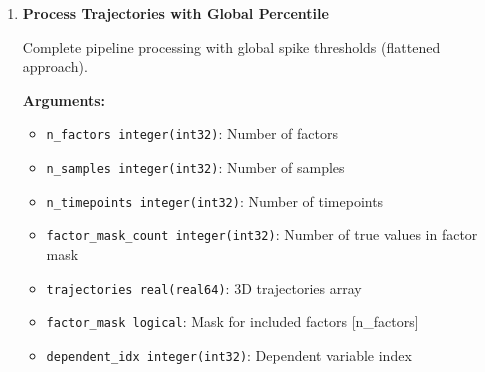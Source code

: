 \begin{enumerate}
\begin{enumerate}
\begin{itemize}
                    \item \texttt{ierr integer(int32)}: Error code
                  \end{itemize}
                  \begin{lstlisting}[language=Fortran, caption={Complete Pipeline with Per-Timepoint Thresholds}]
call process_trajectories_alloc(trajectories, n_factors, n_samples, &
                    n_timepoints, factor_mask, factor_mask_count, & 
                    dependent_idx, mode, percentile, &
                    integrated_contribs,spike_contribs, &
                    thresholds_integrated_contrib, &
                    outliers_integrated_contrib, &
                    thresholds_spike_contrib, &
                    outliers_spike_contrib, ierr)
                  \end{lstlisting}
                  
            \item \textbf{Process Trajectories with Global Percentile}
                  
                  Complete pipeline processing with global spike thresholds (flattened
                  approach).
                  
                  \textbf{Arguments:}
                  \begin{itemize}
                    \item \texttt{n\_factors integer(int32)}: Number of factors
                          
                    \item \texttt{n\_samples integer(int32)}: Number of samples
                          
                    \item \texttt{n\_timepoints integer(int32)}: Number of timepoints
                          
                    \item \texttt{factor\_mask\_count integer(int32)}: Number of true values
                          in factor mask
                          
                    \item \texttt{trajectories real(real64)}: 3D trajectories array
                          
                    \item \texttt{factor\_mask logical}: Mask for included factors [n\_factors]
                          
                    \item \texttt{dependent\_idx integer(int32)}: Dependent variable index
                          

\end{itemize}
\end{enumerate}
\end{enumerate}
